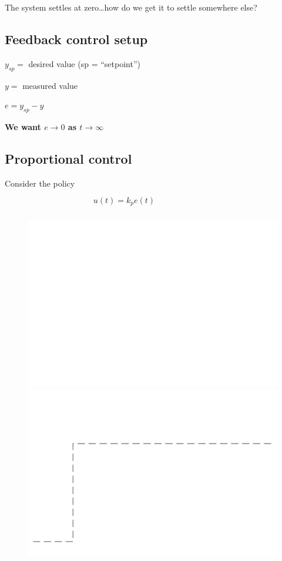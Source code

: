 \documentclass[
  letterpaper,
  DIV=11,
  numbers=noendperiod,
  oneside]{scrartcl}
\begin{document}
The system settles at zero\ldots how do we get it to settle somewhere
else?

\subsection{Feedback control setup}\label{feedback-control-setup}

\(y_{sp}=\) desired value (sp = ``setpoint'')

\(y =\) measured value

\(e = y_{sp} - y\)

\textbf{We want \(e \to 0\) as \(t \to \infty\)}

\subsection{Proportional control}\label{proportional-control}

Consider the policy
\[u(t) = k_p e(t) \phantom{+ k_i \int_{0}^{t} e(\tau) d \tau}\]

\begin{figure}

\begin{minipage}{0.50\linewidth}
\includegraphics{figs/anim_P_u.gif}\end{minipage}%
%
\begin{minipage}{0.50\linewidth}
\includegraphics{figs/anim_P_y.gif}\end{minipage}%

\end{figure}%
\end{document}
